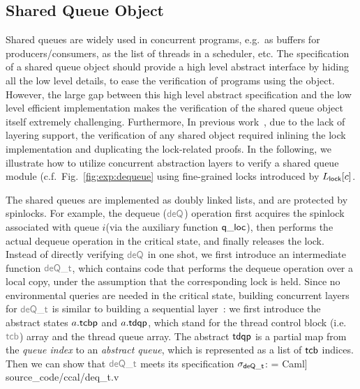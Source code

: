 \subsection{Shared Queue Object}
\label{sec:shared-queue}
Shared queues are widely used in concurrent programs, e.g.\, 
as buffers for producers/consumers,
as the list of threads in a scheduler, etc.
The specification of a shared queue object should provide a high level abstract
interface by hiding all the low level details,
to ease the verification of programs using the object.
However, the large gap between this high level abstract specification
and the low level efficient implementation makes the verification of the shared queue object
itself extremely challenging.
Furthermore,
In previous work~\cite{lili16},
due to the lack of layering support,
the verification of any shared object
required inlining the lock implementation
and duplicating the lock-related proofs.
In the following, we illustrate how to utilize concurrent
abstraction layers to verify a shared queue module
(c.f.\ Fig.~\ref{fig:exp:dequeue}
using fine-grained locks  introduced by $L_{\mathsf{\textcolor{black}{lock}}}[c]$.

The shared queues are implemented as doubly linked lists, and are protected
by spinlocks. For example, the dequeue ($\commc{deQ}$) operation
first acquires the spinlock associated with queue $i$(via the auxiliary function $\mathsf{q\_loc}$),
then performs the actual dequeue operation in the critical state,
and finally releases the lock.
Instead of directly verifying $\commc{deQ}$ in one shot, 
we first introduce an intermediate function
$\commc{deQ\_t}$, which contains
code that performs the dequeue operation
over a local copy, under the assumption that
the corresponding lock is held.
Since no environmental queries are needed in the critical state, 
building concurrent layers for $\commc{deQ\_t}$ is similar to building a sequential layer~\cite{dscal15}:
we first introduce the abstract states $a.\mathsf{\textcolor{black}{tcbp}}$ and $a.\mathsf{\textcolor{black}{tdqp}}$, which stand for the thread control block (i.e.\, $\commc{tcb}$) array
and the thread queue array.
The  abstract $\mathsf{\textcolor{black}{tdqp}}$ is a partial map from the \emph{queue index}
to an \emph{abstract queue}, which is represented as
a list of $\mathsf{\textcolor{black}{tcb}}$ indices.
Then we can show that $\commc{deQ\_t}$ meets its specification
$\sigma_{\mathsf{deQ}\mathsf{\textcolor{black}{\_t}}}$:%
 = Caml] {source_code/ccal/deq_t.v}%

